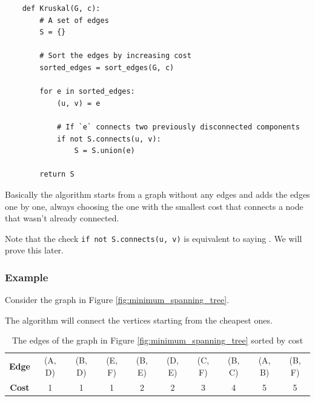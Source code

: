 \documentclass[12pt]{extarticle}
\begin{document}
\begin{verbatim}
    def Kruskal(G, c):
        # A set of edges 
        S = {}
        
        # Sort the edges by increasing cost
        sorted_edges = sort_edges(G, c)
        
        for e in sorted_edges:
            (u, v) = e

            # If `e` connects two previously disconnected components
            if not S.connects(u, v):
                S = S.union(e)

        return S
\end{verbatim}

Basically the algorithm starts from a graph without any edges and adds the edges one by one, always choosing the one with the smallest cost that connects a node that wasn't already connected.

Note that the check \texttt{if not S.connects(u, v)} is equivalent to saying .
We will prove this later.

\subsubsection{Example}

Consider the graph in Figure \ref{fig:minimum_spanning_tree}.

The algorithm will connect the vertices starting from the cheapest ones.

\begin{table}[H]
    \centering
    \begin{tabular}{ |c|c c c c c c c c c| }
        \hline
        \textbf{Edge} & (A, D) & (B, D) & (E, F) & (B, E) & (D, E) & (C, F) & (B, C) & (A, B) & (B, F) \\
        \textbf{Cost} & 1      & 1      & 1      & 2      & 2      & 3      & 4      & 5      & 5      \\
        \hline
    \end{tabular}
    \caption{The edges of the graph in Figure \ref{fig:minimum_spanning_tree} sorted by cost}
    \label{tab:kruskal_edges}
\end{table}
\end{document}
